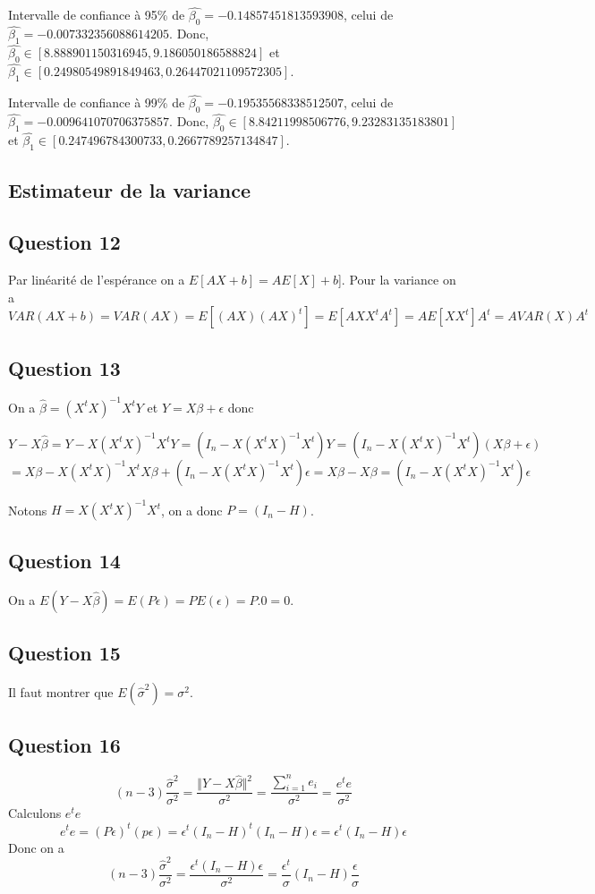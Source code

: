 \documentclass[pdflatex]{article}
\theoremstyle{definition}
\begin{document}
Intervalle de confiance \`a 95\% de $\hat{\beta_0} = -0.14857451813593908$, celui de $\hat{\beta_1} = -0.007332356088614205$.  Donc, $ \hat{\beta_0} \in [8.888901150316945, 9.186050186588824]$ et $\hat{\beta_1} \in [0.24980549891849463, 0.26447021109572305]$.

Intervalle de confiance \`a 99\% de $\hat{\beta_0} = -0.19535568338512507$, celui de $\hat{\beta_1} = -0.009641070706375857$. Donc, $ \hat{\beta_0} \in [8.84211998506776, 9.23283135183801]$ et $\hat{\beta_1} \in [0.247496784300733, 0.2667789257134847]$.



\subsection*{Estimateur de la variance}
\subsection*{Question 12}
Par lin\'earit\'e de l'esp\'erance on a $E[AX+b] = AE[X] + b$]. Pour la variance on a 
$$
VAR(AX+b) = VAR(AX) = E[(AX)(AX)^t] = E[AXX^tA^t] = AE[XX^t]A^t = AVAR(X)A^t
$$

\subsection*{Question 13}
On a $\hat{\beta} = (X^tX)^{-1}X^tY$ et $Y = X\beta + \epsilon$ donc

$$Y - X\hat{\beta} = Y - X(X^tX)^{-1}X^tY = (I_n - X(X^tX)^{-1}X^t)Y = (I_n - X(X^tX)^{-1}X^t)(X\beta +\epsilon) 
$$
$$
= X\beta - X(X^tX)^{-1}X^tX\beta + (I_n-X(X^tX)^{-1}X^t)\epsilon = X\beta - X\beta = (I_n - X(X^tX)^{-1}X^t)\epsilon
$$

Notons $H = X(X^tX)^{-1}X^t$, on a donc $P = (I_n - H)$.

\subsection*{Question 14}
On a $E(Y-X\hat{\beta}) = E(P\epsilon) = PE(\epsilon) = P.0 = 0$.


\subsection*{Question 15}
Il faut montrer que $E(\hat{\sigma}^2)=\sigma^2$.


\subsection*{Question 16}
$$
(n-3)\frac{\hat{\sigma}^2}{\sigma^2} = \frac{\Vert Y - X\hat{\beta}\Vert^2}{\sigma^2} = \frac{\sum_{i=1}^{n}e_i}{\sigma^2} = \frac{e^te}{\sigma^2}
$$
Calculons $e^te$
$$
e^te = (P\epsilon)^t(p\epsilon) = \epsilon^t(I_n-H)^t(I_n - H)\epsilon = \epsilon^t(I_n - H)\epsilon
$$
Donc on a 
$$
(n-3)\frac{\hat{\sigma}^2}{\sigma^2} = \frac{\epsilon^t(I_n - H)\epsilon}{\sigma^2} = \frac{\epsilon^t}{\sigma}(I_n - H)\frac{\epsilon}{\sigma}
$$
\end{document}
